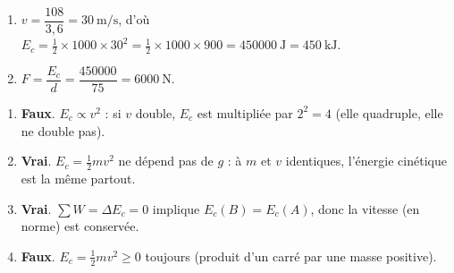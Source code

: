 \documentclass[11pt,a4paper]{article}
\begin{document}
\begin{corrige}
\begin{enumerate}[label=\alph*)]
  \item $v=\dfrac{108}{3,6}=\qty{30}{\metre\per\second}$, d'où
        $E_c=\tfrac12\times1000\times30^2=\tfrac12\times1000\times900=\qty{450000}{\joule}=\qty{450}{\kilo\joule}$.
  \item $F=\dfrac{E_c}{d}=\dfrac{450000}{75}=\qty{6000}{\newton}$.
\end{enumerate}
\end{corrige}

\begin{corrige}
\begin{enumerate}[label=\alph*)]
  \item \textbf{Faux}. $E_c\propto v^2$ : si $v$ double, $E_c$ est multipliée par $2^2=4$ (elle
        quadruple, elle ne double pas).
  \item \textbf{Vrai}. $E_c=\tfrac12 m v^2$ ne dépend pas de $g$ : à $m$ et $v$ identiques, l'énergie
        cinétique est la même partout.
  \item \textbf{Vrai}. $\sum W=\Delta E_c=0$ implique $E_c(B)=E_c(A)$, donc la vitesse (en norme) est
        conservée.
  \item \textbf{Faux}. $E_c=\tfrac12 m v^2\geq0$ toujours (produit d'un carré par une masse positive).
\end{enumerate}
\end{corrige}
\end{document}
